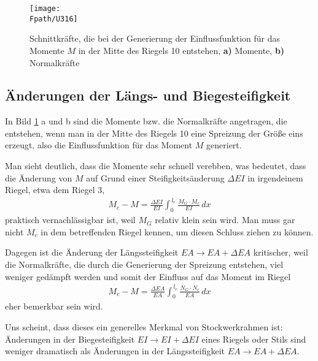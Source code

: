 {{{{{{{{{%
\begin{figure}[tbp]
\centering
\texttt{[image: \\Fpath/U316]}
\caption{Schnittkr\"{a}fte, die bei der Generierung der Einflussfunktion f\"{u}r das Momente $M$ in der Mitte des Riegels 10 entstehen, \textbf{ a)} Momente, \textbf{ b)} Normalkr\"{a}fte}
\label{U316}
\end{figure}%
\textcolor{blau2}{\section{\"{A}nderungen der L\"{a}ngs- und Biegesteifigkeit}}
In Bild \ref{U316} a und b sind die Momente bzw. die Normalkr\"{a}fte angetragen, die entstehen, wenn man in der Mitte des Riegels 10 eine Spreizung der Gr\"{o}{\ss}e eins erzeugt, also die Einflussfunktion f\"{u}r das Moment $M$ generiert.

Man sieht deutlich, dass die Momente sehr schnell verebben, was bedeutet, dass die \"{A}nderung von $M$ auf Grund einer Steifigkeits\"{a}nderung $\Delta EI$ in irgendeinem Riegel, etwa dem Riegel 3,
\begin{align}
M_c - M =  \frac{\Delta EI}{EI}\int_0^{\,l_e} \frac{M_G \cdot M_c}{EI}\,dx
\end{align}
praktisch vernachl\"{a}ssigbar ist, weil $M_G$ relativ klein sein wird. Man muss gar nicht $M_c$ in dem betreffenden Riegel kennen, um diesen Schluss ziehen zu k\"{o}nnen.

Dagegen ist die \"{A}nderung der L\"{a}ngssteifigkeit $EA \to EA + \Delta EA$ kritischer, weil die Normalkr\"{a}fte, die durch die Generierung der Spreizung entstehen, viel weniger ged\"{a}mpft werden und somit der Einfluss auf das Moment im Riegel
\begin{align}
M_c - M = \frac{\Delta EA}{EA}\int_0^{\,l_e} \frac{N_G \cdot N_c}{EA}\,dx
\end{align}
eher bemerkbar sein wird.

Uns scheint, dass dieses ein generelles Merkmal von Stockwerkrahmen ist: \"{A}nderungen in der Biegesteifigkeit $EI \to EI + \Delta EI$ eines Riegels oder Stils sind weniger dramatisch als \"{A}nderungen in der L\"{a}ngssteifigkeit $EA \to EA + \Delta EA$.


}}}}}}}}}
